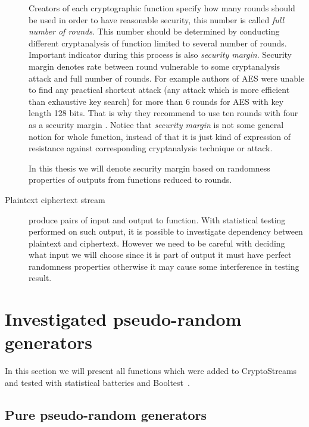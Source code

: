 \documentclass[
    digital,    %
    oneside,    %
    color,
    11pt,
    nocover,
    notable,
    nolof,
    nolot,
    final
]{fithesis3}
\begin{document}
\begin{description}
	Creators of each cryptographic function specify how many rounds should be used in order to have reasonable security, this number is called \textit{full number of rounds}. This number should be determined by conducting different cryptanalysis of function limited to several number of rounds. Important indicator during this process is also \textit{security margin}. Security margin denotes rate between round vulnerable to some cryptanalysis attack and full number of rounds. For example authors of AES were unable to find any practical shortcut attack (any attack which is more efficient than exhaustive key search) for more than 6 rounds for AES with key length 128 bits. That is why they recommend to use ten rounds with four as a security margin \cite{daemen1999aes}. Notice that \textit{security margin} is not some general notion for whole function, instead of that it is just kind of expression of resistance against corresponding cryptanalysis technique or attack.
	
	In this thesis we will denote security margin based on randomness properties of outputs from functions reduced to rounds.
	
	\item[Plaintext ciphertext stream] produce pairs of input and output to function. With statistical testing performed on such output, it is possible to investigate dependency between plaintext and ciphertext. However we need to be careful with deciding what input we will choose since it is part of output it must have perfect randomness properties otherwise it may cause some interference in testing result.

\end{description}

\section{Investigated pseudo-random generators}

In this section we will present all functions which were added to CryptoStreams and tested with statistical batteries and Booltest~\cite{booltest-secrypt2017}.

\subsection{Pure pseudo-random generators}
\end{document}
